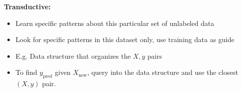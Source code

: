 \documentclass{article}
\begin{document}
\textbf{Transductive:}
\begin{itemize}
    \item Learn specific patterns about this particular set of unlabeled data
    \item Look for specific patterns in this dataset only, use training data as guide
    \item E.g. Data structure that organizes the $X, y$ pairs
    \item To find $y_{\text{pred}}$ given $X_{\text{new}}$, query into the data structure and use the closest $(X, y)$ pair.
\end{itemize}
\end{document}
